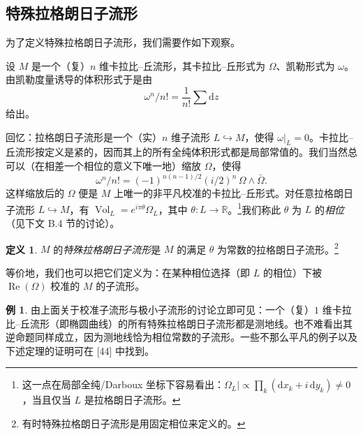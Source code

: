 \documentclass[11pt,a4paper]{article}
\theoremstyle{plain}
\theoremstyle{definition}
\newtheorem{definition}[theorem]{定义}
\newtheorem*{example}{例}
\begin{document}
\subsection{特殊拉格朗日子流形}

为了定义特殊拉格朗日子流形，我们需要作如下观察。

设 $M$ 是一个（复）$n$ 维卡拉比–丘流形，其卡拉比–丘形式为 $\Omega$、凯勒形式为 $\omega$。由凯勒度量诱导的体积形式于是由
\[
\omega^n/n!=\frac{1}{n!}\sum\mathrm{d}z
\]
给出。

回忆：拉格朗日子流形是一个（实）$n$ 维子流形 $L\hookrightarrow M$，使得 $\omega|_L=0$。卡拉比–丘流形按定义是紧的，因而其上的所有全纯体积形式都是局部常值的。我们当然总可以（在相差一个相位的意义下唯一地）缩放 $\Omega$，使得
\[
\omega^n/n!=(-1)^{n(n-1)/2}(i/2)^n\,\Omega\wedge\bar{\Omega}.
\]
这样缩放后的 $\Omega$ 便是 $M$ 上唯一的非平凡校准的卡拉比–丘形式。对任意拉格朗日子流形 $L\hookrightarrow M$，有 $\operatorname{Vol}_L=e^{i\pi\theta}\Omega_L$，其中 $\theta:L\to\mathbb{R}$。\footnote{这一点在局部全纯/Darboux 坐标下容易看出：$\Omega_L\big|\propto\prod_k(\mathrm{d}x_k+i\,\mathrm{d}y_k)\ne0$，当且仅当 $L$ 是拉格朗日子流形。}我们称此 $\theta$ 为 $L$ 的\emph{相位}（见下文 B.4 节的讨论）。

\begin{definition}
$M$ 的\emph{特殊拉格朗日子流形}是 $M$ 的满足 $\theta$ 为常数的拉格朗日子流形。\footnote{有时特殊拉格朗日子流形是用固定相位来定义的。}
\end{definition}

等价地，我们也可以把它们定义为：在某种相位选择（即 $L$ 的相位）下被 $\operatorname{Re}(\Omega)$ 校准的 $M$ 的子流形。

\begin{example}
由上面关于校准子流形与极小子流形的讨论立即可见：一个（复）$1$ 维卡拉比–丘流形（即椭圆曲线）的所有特殊拉格朗日子流形都是测地线。也不难看出其逆命题同样成立，因为测地线恰为相位常数的子流形。一些不那么平凡的例子以及下述定理的证明可在 [44] 中找到。
\end{example}
\end{document}
